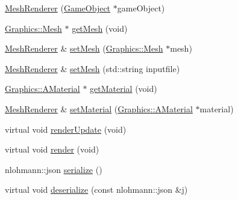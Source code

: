 \begin{DoxyCompactItemize}
\item 
\mbox{\hyperlink{class_beer_engine_1_1_component_1_1_mesh_renderer_a9597f09757bac34c6f5c00d4cb18add3}{Mesh\+Renderer}} (\mbox{\hyperlink{class_beer_engine_1_1_game_object}{Game\+Object}} $\ast$game\+Object)
\item 
\mbox{\hyperlink{class_beer_engine_1_1_graphics_1_1_mesh}{Graphics\+::\+Mesh}} $\ast$ \mbox{\hyperlink{class_beer_engine_1_1_component_1_1_mesh_renderer_ac819f6d8c1791174fa7b9f060a8b8204}{get\+Mesh}} (void)
\item 
\mbox{\hyperlink{class_beer_engine_1_1_component_1_1_mesh_renderer}{Mesh\+Renderer}} \& \mbox{\hyperlink{class_beer_engine_1_1_component_1_1_mesh_renderer_a818276a7fe8703a04bf431a41fa4c907}{set\+Mesh}} (\mbox{\hyperlink{class_beer_engine_1_1_graphics_1_1_mesh}{Graphics\+::\+Mesh}} $\ast$mesh)
\item 
\mbox{\hyperlink{class_beer_engine_1_1_component_1_1_mesh_renderer}{Mesh\+Renderer}} \& \mbox{\hyperlink{class_beer_engine_1_1_component_1_1_mesh_renderer_a0bc2f51937864cfb8a470cd9a19321e6}{set\+Mesh}} (std\+::string inputfile)
\item 
\mbox{\hyperlink{class_beer_engine_1_1_graphics_1_1_a_material}{Graphics\+::\+A\+Material}} $\ast$ \mbox{\hyperlink{class_beer_engine_1_1_component_1_1_mesh_renderer_ae3ce0ffa128f92e36e9c09fc6349ddf6}{get\+Material}} (void)
\item 
\mbox{\hyperlink{class_beer_engine_1_1_component_1_1_mesh_renderer}{Mesh\+Renderer}} \& \mbox{\hyperlink{class_beer_engine_1_1_component_1_1_mesh_renderer_a9d4408a8c5e670c130394c59eeb5ccf2}{set\+Material}} (\mbox{\hyperlink{class_beer_engine_1_1_graphics_1_1_a_material}{Graphics\+::\+A\+Material}} $\ast$material)
\item 
virtual void \mbox{\hyperlink{class_beer_engine_1_1_component_1_1_mesh_renderer_abca4caa865363fdccb1b0c6fc6f7c81d}{render\+Update}} (void)
\item 
virtual void \mbox{\hyperlink{class_beer_engine_1_1_component_1_1_mesh_renderer_ace87e6038f061bf1815f047f4bc0c6e8}{render}} (void)
\item 
nlohmann\+::json \mbox{\hyperlink{class_beer_engine_1_1_component_1_1_mesh_renderer_a65c6c22ae40b5b94f590c3a8bf14d0d0}{serialize}} ()
\item 
virtual void \mbox{\hyperlink{class_beer_engine_1_1_component_1_1_mesh_renderer_a19b2d1dd25274ea7af898af2bc305a7b}{deserialize}} (const nlohmann\+::json \&j)
\end{DoxyCompactItemize}
